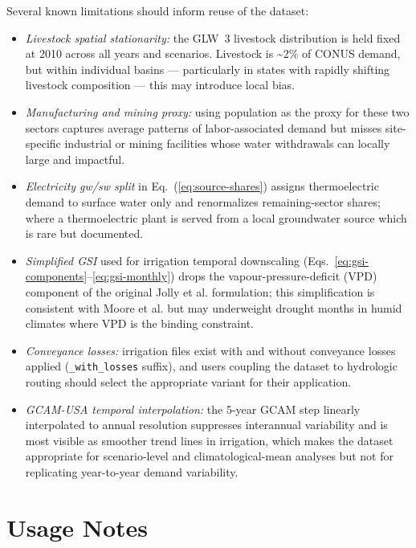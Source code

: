 \documentclass[fleqn,10pt]{wlscirep}
\begin{document}
Several known limitations should inform reuse of the dataset:
\begin{itemize}
    \item \emph{Livestock spatial stationarity:} the GLW~3 livestock distribution is held fixed at 2010 across all years and scenarios. Livestock is \textasciitilde2\% of CONUS demand, but within individual basins --- particularly in states with rapidly shifting livestock composition --- this may introduce local bias. 
    \item \emph{Manufacturing and mining proxy:} using population as the proxy for these two sectors captures average patterns of labor-associated demand but misses site-specific industrial or mining facilities whose water withdrawals can locally large and impactful.
    \item \emph{Electricity gw/sw split} in Eq.~(\ref{eq:source-shares}) assigns thermoelectric demand to surface water only and renormalizes remaining-sector shares; where a thermoelectric plant is served from a local groundwater source which is rare but documented.
    \item \emph{Simplified GSI} used for irrigation temporal downscaling (Eqs.~\ref{eq:gsi-components}--\ref{eq:gsi-monthly}) drops the vapour-pressure-deficit (VPD) component of the original Jolly et al.\cite{Jolly_2005} formulation; this simplification is consistent with Moore et al.\cite{Moore_2015} but may underweight drought months in humid climates where VPD is the binding constraint. 
    \item \emph{Conveyance losses:} irrigation files exist with and without conveyance losses applied (\texttt{\_with\_losses} suffix), and users coupling the dataset to hydrologic routing should select the appropriate variant for their application. 
    \item \emph{GCAM-USA temporal interpolation:} the 5-year GCAM step linearly interpolated to annual resolution suppresses interannual variability and is most visible as smoother trend lines in irrigation, which makes the dataset appropriate for scenario-level and climatological-mean analyses but not for replicating year-to-year demand variability.
\end{itemize}

\section*{Usage Notes}
\end{document}
